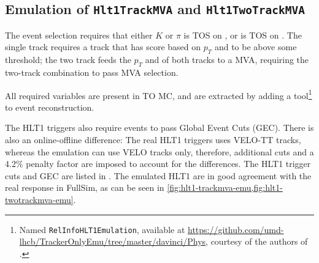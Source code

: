 \subsection{Emulation of \texttt{Hlt1TrackMVA} and \texttt{Hlt1TwoTrackMVA}}

The event selection requires that either $K$ or $\pi$ is TOS on
,
or \Dz is TOS on .
The single track  requires a track that has score based on
$p_T$ and \ipChiSq to be above some threshold;
the two track  feeds the $p_T$ and \ipChiSq of both
tracks to a  MVA,
requiring the two-track combination to pass MVA selection.

All required variables are present in TO MC, and are extracted by adding
a tool\footnote{
    Named \lstinline{RelInfoHLT1Emulation}, available at
    \url{https://github.com/umd-lhcb/TrackerOnlyEmu/tree/master/davinci/Phys},
    courtesy of the authors of \cite{LHCb-INT-2019-025}.
} to event reconstruction.

The HLT1 triggers also require events to pass Global Event Cuts (GEC).
There is also an online-offline difference:
The real HLT1 triggers uses VELO-TT tracks, whereas the emulation can use
VELO tracks only, therefore, additional cuts and a 4.2\% penalty factor are
imposed to account for the differences.
The HLT1 trigger cuts and GEC are listed in \cite{LHCb-INT-2019-025}.
The emulated HLT1 are in good agreement with the real response in FullSim, as
can be seen in \cref{fig:hlt1-trackmva-emu,fig:hlt1-twotrackmva-emu}.

